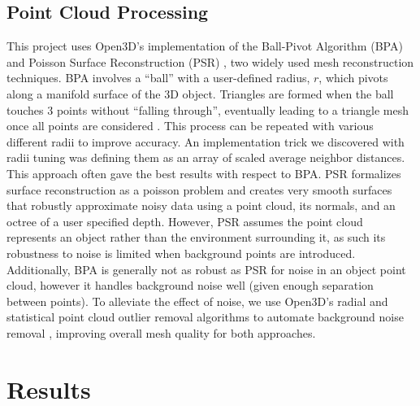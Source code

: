 \documentclass[conference,compsoc]{IEEEtran}
\begin{document}
\subsection{Point Cloud Processing}
This project uses Open3D's implementation of the Ball-Pivot Algorithm (BPA) \cite{bpa}
\cite{sr_o3d} and Poisson Surface Reconstruction (PSR) \cite{psr}\cite{sr_o3d}, 
two widely used mesh reconstruction techniques. 
BPA involves a “ball” with a user-defined radius, $r$, 
which pivots along a manifold surface of the 3D object.
Triangles are formed when the ball touches 3 points 
without “falling through”, eventually leading to a triangle mesh 
once all points are considered \cite{bpa}. This process can be 
repeated with various different radii to improve accuracy. 
An implementation trick we discovered with radii tuning was 
defining them as an array of scaled average neighbor distances. 
This approach often gave the best results with respect to BPA.
PSR \cite{psr} formalizes surface reconstruction as a 
poisson problem and creates very smooth surfaces that 
robustly approximate noisy data using a point cloud, 
its normals, and an octree of a user specified depth. 
However, PSR assumes the point cloud represents an object 
rather than the environment surrounding it, as such its 
robustness to noise is limited when background points are 
introduced. Additionally, BPA \cite{bpa} is generally 
not as robust as PSR for noise in an object point cloud, 
however it handles background noise well 
(given enough separation between points). 
To alleviate the effect of noise, we use 
Open3D's radial and statistical point cloud outlier removal 
algorithms to automate background noise removal \cite{pcr},
improving overall mesh quality for both approaches. 

\section{Results}
\end{document}
